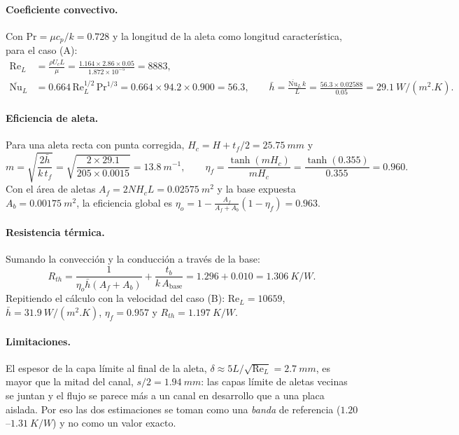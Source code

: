 \documentclass[11pt,letterpaper]{article}
\begin{document}
\paragraph{Coeficiente convectivo.} Con $\text{Pr}=\mu c_p/k=0.728$ y la longitud de la aleta como longitud característica, para el caso (A):
\begin{align}
\text{Re}_L&=\frac{\rho U_c L}{\mu}=\frac{1.164\times2.86\times0.05}{1.872\times10^{-5}}=\num{8883},\\
\overline{\text{Nu}}_L&=0.664\,\text{Re}_L^{1/2}\,\text{Pr}^{1/3}=0.664\times94.2\times0.900=56.3,\qquad
\bar h=\frac{\overline{\text{Nu}}_L\,k}{L}=\frac{56.3\times0.02588}{0.05}=\SI{29.1}{W/(m^2.K)}.
\end{align}

\paragraph{Eficiencia de aleta.} Para una aleta recta con punta corregida, $H_c=H+t_f/2=\SI{25.75}{mm}$ y
\begin{equation}
m=\sqrt{\frac{2\bar h}{k\,t_f}}=\sqrt{\frac{2\times29.1}{205\times0.0015}}=\SI{13.8}{m^{-1}},\qquad
\eta_f=\frac{\tanh(mH_c)}{mH_c}=\frac{\tanh(0.355)}{0.355}=0.960 .
\end{equation}
Con el área de aletas $A_f=2NH_cL=\SI{0.02575}{m^2}$ y la base expuesta $A_b=\SI{0.00175}{m^2}$, la eficiencia global es $\eta_o=1-\frac{A_f}{A_f+A_b}(1-\eta_f)=0.963$.

\paragraph{Resistencia térmica.} Sumando la convección y la conducción a través de la base:
\begin{equation}
R_{th}=\frac{1}{\eta_o\bar h(A_f+A_b)}+\frac{t_b}{k\,A_{\text{base}}}=1.296+0.010=\SI{1.306}{K/W}.
\end{equation}
Repitiendo el cálculo con la velocidad del caso (B): $\text{Re}_L=\num{10659}$, $\bar h=\SI{31.9}{W/(m^2.K)}$, $\eta_f=0.957$ y $R_{th}=\SI{1.197}{K/W}$.

\paragraph{Limitaciones.} El espesor de la capa límite al final de la aleta, $\delta\approx5L/\sqrt{\text{Re}_L}=\SI{2.7}{mm}$, es mayor que la mitad del canal, $s/2=\SI{1.94}{mm}$: las capas límite de aletas vecinas se juntan y el flujo se parece más a un canal en desarrollo que a una placa aislada. Por eso las dos estimaciones se toman como una \emph{banda} de referencia ($1.20$--$\SI{1.31}{K/W}$) y no como un valor exacto.
\end{document}

